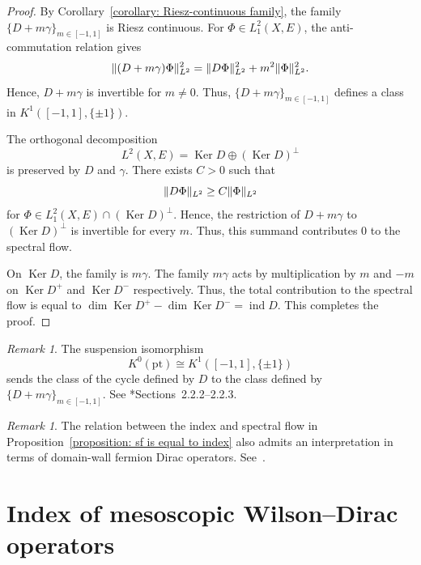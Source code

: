 \documentclass[a4paper,oneside,12pt]{amsart}
\theoremstyle{plain}
\theoremstyle{definition}
\theoremstyle{remark}
\newtheorem{remark}[theorem]{Remark}
\DeclarePairedDelimiter{\norm}{\lVert}{\rVert}
\DeclareMathOperator{\kernel}{Ker}
\DeclareMathOperator{\indexAtiyahSinger}{ind}
\newcommand{\Ltwonorm}[2][L^2]{\norm{#2}_{#1}}
\begin{document}
\begin{proof}
  By Corollary~\ref{corollary: Riesz-continuous family}, the family $\{D + m\gamma\}_{m \in [-1,1]}$ is Riesz continuous.
  For $\Phi \in L^2_1(X,E)$, the anti-commutation relation gives
  \begin{equation}
    \Ltwonorm{(D+m\gamma)\Phi}^2 = \Ltwonorm{D \Phi}^2 + m^2 \Ltwonorm{\Phi}^2.
  \end{equation}
  Hence, $D+m\gamma$ is invertible for $m \ne 0$.
  Thus, $\{D + m\gamma\}_{m \in [-1,1]}$ defines a class in $K^1([-1,1],\{\pm 1\})$.

  The orthogonal decomposition
  \begin{equation}
    L^2(X,E) = \kernel D \oplus (\kernel D)^{\perp}
  \end{equation}
  is preserved by $D$ and $\gamma$.
  There exists $C > 0$ such that
  \begin{equation}
    \Ltwonorm{D \Phi} \ge C \Ltwonorm{\Phi}
  \end{equation}
  for $\Phi \in L^2_1(X,E) \cap (\kernel D)^{\perp}$.
  Hence, the restriction of $D+m\gamma$ to $(\kernel D)^{\perp}$ is invertible for every $m$.
  Thus, this summand contributes $0$ to the spectral flow.

  On $\kernel D$, the family is $m\gamma$.
  The family $m\gamma$ acts by multiplication by $m$ and $-m$ on $\kernel D^+$ and $\kernel D^-$ respectively.
  Thus, the total contribution to the spectral flow is equal to $\dim \kernel D^+ - \dim \kernel D^- = \indexAtiyahSinger D$.
  This completes the proof.
\end{proof}

\begin{remark}
  The suspension isomorphism
  \begin{equation}
    K^0(\mathrm{pt}) \cong K^1([-1,1],\{\pm 1\})
  \end{equation}
  sends the class of the cycle defined by $D$ to the class defined by $\{D+m\gamma\}_{m\in[-1,1]}$.
  See \cite{MR5076866}*{Sections~2.2.2--2.2.3}.
\end{remark}

\begin{remark}
  The relation between the index and spectral flow in Proposition~\ref{proposition: sf is equal to index} also admits an interpretation in terms of domain-wall fermion Dirac operators.
  See~\cite{MR4179728}.
\end{remark}

\section{Index of mesoscopic Wilson--Dirac operators}\label{section: index of mesoscopic Wilson Dirac operators}
\end{document}
